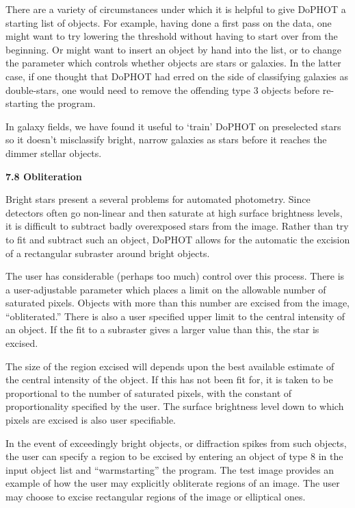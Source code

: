 There are a variety of circumstances under which it is
helpful to give DoPHOT a starting list of objects.  For
example, having done a first pass on the data, one might
want to try lowering the threshold without having to start
over from the beginning.  Or might want to insert
an object by hand into the list, or to change the parameter
which controls whether objects are stars or galaxies.
In the latter case, if one thought that DoPHOT had erred
on the side of classifying galaxies as double-stars, one
would need to remove the offending type 3 objects before
re-starting the program.

In galaxy fields, we have found it useful to `train' DoPHOT
on preselected stars so it doesn't misclassify bright, narrow 
galaxies as stars before it reaches the dimmer stellar objects.

\centerline{\bf 7.8 Obliteration}

Bright stars present a several problems for automated
photometry.  Since detectors often go non-linear and then
saturate at high surface brightness levels, it is difficult
to subtract badly overexposed stars from the image.  Rather
than try to fit and subtract such an object, DoPHOT allows
for the automatic the excision of a rectangular subraster
around bright objects.

The user has considerable (perhaps too much) control over
this process.  There is a user-adjustable parameter which
places a limit on the allowable number of saturated pixels.
Objects with more than this number are excised from the
image, ``obliterated.''  There is also a user specified
upper limit to the central intensity of an object.  If the
fit to a subraster gives a larger value than this, the star
is excised.

The size of the region excised will depends upon the best
available estimate of the central intensity of the object.
If this has not been fit for, it is taken to be proportional
to the number of saturated pixels, with the constant of
proportionality specified by the user.  The surface
brightness level down to which pixels are excised is also
user specifiable.

In the event of exceedingly bright objects, or diffraction
spikes from such objects, the user can specify a region to
be excised by entering an object of type 8 in the input
object list and ``warmstarting'' the program.  
The test image provides an example of how the user
may explicitly obliterate regions of an image.  The user may 
choose to excise rectangular regions of the image or elliptical
ones. 

